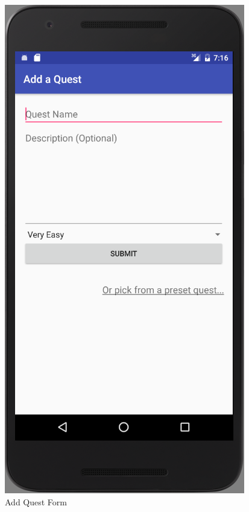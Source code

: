 \begin{figure}[ht]
\begin{minipage}[b]{0.45\linewidth}
    \includegraphics[width=.7\linewidth, frame]{../images/Screenshot/AddQuestScreen.png}
    \caption{Add Quest Form} 
    \vspace{4ex}
  \end{minipage}%
  \begin{minipage}[b]{0.45\linewidth}
    \centering

\end{minipage}
\end{figure}
